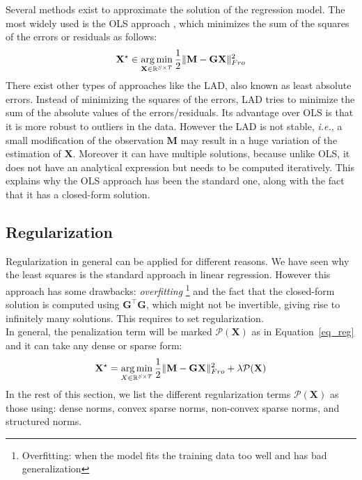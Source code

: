 Several methods exist to approximate the solution of the regression model. The most widely used is the \ac{OLS} approach \cite{legendre1805nouvelles}, which minimizes the sum of the squares of the errors or residuals as follows:
\begin{equation} \label{eq_ls}
	\mathbf{X^\star} \in \mathop{\mathrm{arg}\,\mathrm{min}}_{\mathbf{X}\in \mathbb{R}^{S\times T}}\frac{1}{2} \|\mathbf{M}-\mathbf{GX}\|_{Fro}^2
\end{equation}
There exist other types of approaches like the \ac{LAD}, also known as least absolute errors. Instead of minimizing the squares of the errors, \ac{LAD} tries to minimize the sum of the absolute values of the errors/residuals. Its advantage over \ac{OLS} is that it is more robust to outliers in the data. However the LAD is not stable, \textit{i.e.}, a small modification of the observation $\mathbf{M}$ may result in a huge variation of the estimation of $\mathbf{X}$. Moreover it can have multiple solutions, because unlike \ac{OLS}, it does not have an analytical expression but needs to be computed iteratively. This explains why the OLS approach has been the standard one, along with the fact that it has a closed-form solution.

\subsection{Regularization}

Regularization in general can be applied for different reasons. We have seen why the least squares is the standard approach in linear regression. However this approach has some drawbacks: \textit{overfitting} \footnote{Overfitting: when the model fits the training data too well and has bad generalization} and the fact that the closed-form solution is computed using $\mathbf{G}^\top\mathbf{G}$, which might not be invertible, giving rise to infinitely many solutions. This requires to set regularization.\\

In general, the penalization term will be marked $\mathcal{P}(\mathbf{X})$ as in Equation~\eqref{eq_reg} and it can take any dense or sparse form:
\begin{equation} \label{eq_reg}
	\mathbf{X}^\star = \mathop{\mathrm{arg}\,\mathrm{min}}_{X\in\mathbb{R}^{S\times T}}\frac{1}{2}\|\mathbf{M}-\mathbf{GX}\|_{Fro}^2 + \lambda\mathcal{P}(\mathbf{X})
\end{equation}
In the rest of this section, we list the different regularization terms $\mathcal{P}(\mathbf{X})$ as those using: dense norms, convex sparse norms, non-convex sparse norms, and structured norms.


